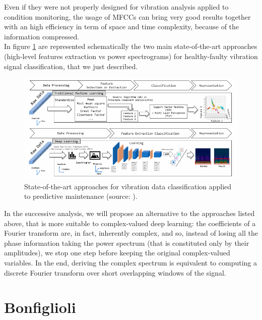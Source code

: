 \documentclass[../main.tex]{subfiles}
\begin{document}
Even if they were not properly designed for vibration analysis applied to condition monitoring, the usage of MFCCs can bring very good results together with an high efficiency in term of space and time complexity, because of the information compressed.\\
In figure \ref{fig:summary_hf_classification_methods} are represented schematically the two main state-of-the-art approaches (high-level features extraction vs power spectrograms) for healthy-faulty vibration signal classification, that we just described.\\
\begin{figure}[!ht]
	\centering
	\includegraphics[width=\textwidth]{pictures/summary_hf_classification_methods.pdf}
	\caption{State-of-the-art approaches for vibration data classification applied to predictive maintenance (source: \cite{deep_learning_vibration_gravity}).}
	\label{fig:summary_hf_classification_methods}	
\end{figure}
In the successive analysis, we will propose an alternative to the approaches listed above, that is more suitable to complex-valued deep learning: the coefficients of a Fourier transform are, in fact, inherently complex, and so, instead of losing all the phase information taking the power spectrum (that is constituted only by their amplitudes), we stop one step before keeping the original complex-valued variables. In the end, deriving the complex spectrum is equivalent to computing a discrete Fourier transform over short overlapping windows of the signal.

\section{Bonfiglioli}
\end{document}
